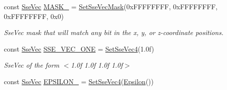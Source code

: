 \begin{DoxyCompactItemize}
const \hyperlink{namespacegfxmath_a0de2243e2b8d0fd46d3af5e036423004}{Sse\+Vec} \hyperlink{namespacegfxmath_a9aed12c2814b84ca35d5d256596bf68e}{M\+A\+S\+K\+\_} = \hyperlink{namespacegfxmath_ae6fdce7b817a9d0caea6a71c5a377bbb}{Set\+Sse\+Vec\+Mask}(0x\+F\+F\+F\+F\+F\+F\+F\+F, 0x\+F\+F\+F\+F\+F\+F\+F\+F, 0x\+F\+F\+F\+F\+F\+F\+F\+F, 0x0)
\begin{DoxyCompactList}\small\item\em Sse\+Vec mask that will match any bit in the x, y, or z-\/coordinate positions. \end{DoxyCompactList}\item 
\hypertarget{namespacegfxmath_a968d22c794bb9a46309737cb9a8112d2}{}const \hyperlink{namespacegfxmath_a0de2243e2b8d0fd46d3af5e036423004}{Sse\+Vec} \hyperlink{namespacegfxmath_a968d22c794bb9a46309737cb9a8112d2}{S\+S\+E\+\_\+\+V\+E\+C\+\_\+\+O\+N\+E} = \hyperlink{namespacegfxmath_a3b21a4362c6ac781c5f6ab922840ba77}{Set\+Sse\+Vec4}(1.\+0f)\label{namespacegfxmath_a968d22c794bb9a46309737cb9a8112d2}

\begin{DoxyCompactList}\small\item\em Sse\+Vec of the form $<$1.\+0f 1.\+0f 1.\+0f 1.\+0f$>$ \end{DoxyCompactList}\item 
\hypertarget{namespacegfxmath_a61d187e87e07e248aaebb359a772f815}{}const \hyperlink{namespacegfxmath_a0de2243e2b8d0fd46d3af5e036423004}{Sse\+Vec} \hyperlink{namespacegfxmath_a61d187e87e07e248aaebb359a772f815}{E\+P\+S\+I\+L\+O\+N\+\_} = \hyperlink{namespacegfxmath_a3b21a4362c6ac781c5f6ab922840ba77}{Set\+Sse\+Vec4}(\hyperlink{group___scalar_math_consts_gafaec804c6b9d6173f5c1fc07ae7fda13}{Epsilon}())\label{namespacegfxmath_a61d187e87e07e248aaebb359a772f815}


\end{DoxyCompactItemize}
